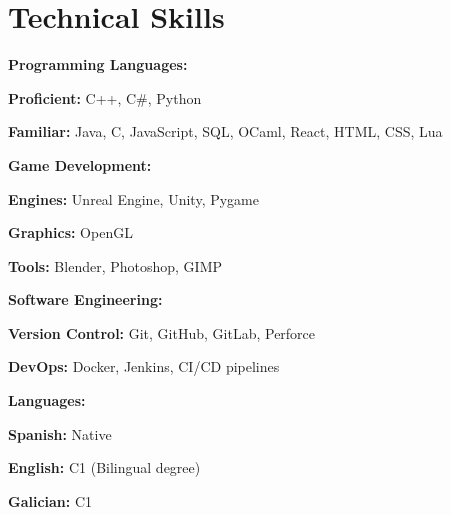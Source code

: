 \section{Technical Skills}

\begin{onecolentry}
\textbf{Programming Languages:}
\begin{highlights}
\item \textbf{Proficient:} C++, C\#, Python
\item \textbf{Familiar:} Java, C, JavaScript, SQL, OCaml, React, HTML, CSS, Lua
\end{highlights}
\end{onecolentry}

\vspace{0.2 cm}

\begin{onecolentry}
\textbf{Game Development:}
\begin{highlights}
\item \textbf{Engines:} Unreal Engine, Unity, Pygame
\item \textbf{Graphics:} OpenGL
\item \textbf{Tools:} Blender, Photoshop, GIMP
\end{highlights}
\end{onecolentry}

\vspace{0.2 cm}

\begin{onecolentry}
\textbf{Software Engineering:}
\begin{highlights}
\item \textbf{Version Control:} Git, GitHub, GitLab, Perforce
\item \textbf{DevOps:} Docker, Jenkins, CI/CD pipelines
\end{highlights}
\end{onecolentry}

\vspace{0.2 cm}

\begin{onecolentry}
\textbf{Languages:}
\begin{highlights}
\item \textbf{Spanish:} Native
\item \textbf{English:} C1 (Bilingual degree)
\item \textbf{Galician:} C1
\end{highlights}
\end{onecolentry}